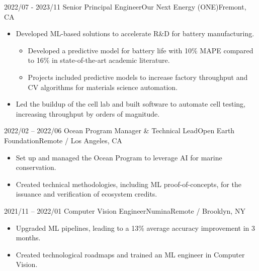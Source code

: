 %
%
%


  

\begin{experiences}
  \experience
    {2022/07 - 2023/11} {Senior Principal Engineer}{Our Next Energy (ONE)}{Fremont, CA}
    { } {
        \begin{itemize}
        \item Developed ML-based solutions to accelerate R\&D for battery manufacturing. 
        \begin{itemize} %
            \item Developed a predictive model for battery life with 10\% MAPE compared to 16\% in state-of-the-art academic literature.
            \item Projects included predictive models to increase factory throughput and CV algorithms for materials science automation.
            \end{itemize}
            
        \item Led the buildup of the cell lab and built software to automate cell testing, increasing throughput by orders of magnitude.                                           
        \end{itemize}
                    }
                    {}

  \experience
    {2022/02 -- 2022/06} {Ocean Program Manager \& Technical Lead}{Open Earth Foundation}{Remote / Los Angeles, CA}
    { }    {
    \begin{itemize}
        \item Set up and managed the Ocean Program to leverage AI for marine conservation.                      
        \item Created technical methodologies, including ML proof-of-concepts, for the issuance and verification of ecosystem credits.
                      \end{itemize}
                    }
        {}

  \experience
    {2021/11 -- 2022/01}     {Computer Vision Engineer}{Numina}{Remote / Brooklyn, NY}
    { }    {
        \begin{itemize}
            \item Upgraded ML pipelines, leading to a 13\% average accuracy improvement in 3 months.
            \item Created technological roadmaps and trained an ML engineer in Computer Vision.
        \end{itemize}
                    }
        {}


\end{experiences}
